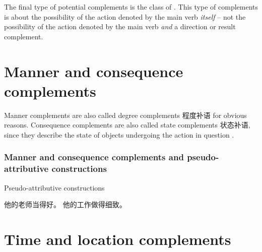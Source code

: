 \documentclass[../main.tex]{subfiles}
\begin{document}
The final type of potential complements is the class of .
This type of complements is about the possibility of the action denoted by the main verb \emph{itself} -- 
not the possibility of the action denoted by the main verb \emph{and} a direction or result complement.


\section{Manner and consequence complements}\label{sec:manner-consequence-complement}

Manner complements are also called degree complements 程度补语 for obvious reasons.
Consequence complements are also called state complements 状态补语, since they describe the state of 
objects undergoing the action in question \citep[]{xianhan2004}.

\subsubsection{Manner and consequence complements and pseudo-attributive constructions}

\begin{exe}
    \ex Pseudo-attributive constructions 
    \begin{xlist}
        \ex 他的老师当得好。
        \ex 他的工作做得细致。
    \end{xlist}
\end{exe}
\citep{huang2008}

\section{Time and location complements}\label{sec:location-complement}
\end{document}
